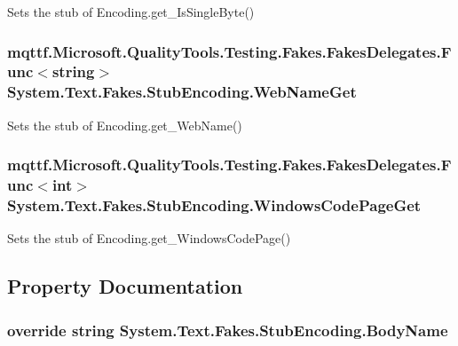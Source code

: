 Sets the stub of Encoding.\-get\-\_\-\-Is\-Single\-Byte()

\hypertarget{class_system_1_1_text_1_1_fakes_1_1_stub_encoding_a43179bb1a9a5cc409e7e22efe0189923}{
\subsubsection[{Web\-Name\-Get}]{\setlength{\rightskip}{0pt plus 5cm}mqttf.\-Microsoft.\-Quality\-Tools.\-Testing.\-Fakes.\-Fakes\-Delegates.\-Func$<$string$>$ System.\-Text.\-Fakes.\-Stub\-Encoding.\-Web\-Name\-Get}}\label{class_system_1_1_text_1_1_fakes_1_1_stub_encoding_a43179bb1a9a5cc409e7e22efe0189923}


Sets the stub of Encoding.\-get\-\_\-\-Web\-Name()

\hypertarget{class_system_1_1_text_1_1_fakes_1_1_stub_encoding_a1b1234ac59b29fc146b2610d45e70c4b}{
\subsubsection[{Windows\-Code\-Page\-Get}]{\setlength{\rightskip}{0pt plus 5cm}mqttf.\-Microsoft.\-Quality\-Tools.\-Testing.\-Fakes.\-Fakes\-Delegates.\-Func$<$int$>$ System.\-Text.\-Fakes.\-Stub\-Encoding.\-Windows\-Code\-Page\-Get}}\label{class_system_1_1_text_1_1_fakes_1_1_stub_encoding_a1b1234ac59b29fc146b2610d45e70c4b}


Sets the stub of Encoding.\-get\-\_\-\-Windows\-Code\-Page()



\subsection{Property Documentation}
\hypertarget{class_system_1_1_text_1_1_fakes_1_1_stub_encoding_a20c078ab2cf0b4bc8e0cd494628b03fd}{
\subsubsection[{Body\-Name}]{\setlength{\rightskip}{0pt plus 5cm}override string System.\-Text.\-Fakes.\-Stub\-Encoding.\-Body\-Name\hspace{0.3cm}{\ttfamily [get]}}}\label{class_system_1_1_text_1_1_fakes_1_1_stub_encoding_a20c078ab2cf0b4bc8e0cd494628b03fd}


